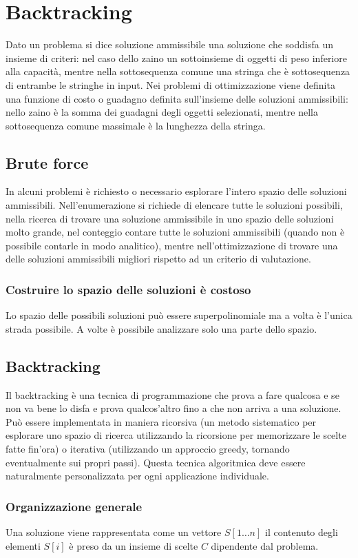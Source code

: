 \chapter{Backtracking}
Dato un problema si dice soluzione ammissibile una soluzione che soddisfa un insieme di criteri: nel caso dello zaino un sottoinsieme di oggetti di peso inferiore alla capacit\`a, mentre
nella sottosequenza comune una stringa che \`e sottosequenza di entrambe le stringhe in input. Nei problemi di ottimizzazione viene definita una funzione di costo o guadagno definita 
sull'insieme delle soluzioni ammissibili: nello zaino \`e la somma dei guadagni degli oggetti selezionati, mentre nella sottosequenza comune massimale \`e la lunghezza della stringa.
\section{Brute force}
In alcuni problemi \`e richiesto o necessario esplorare l'intero spazio delle soluzioni ammissibili. Nell'enumerazione si richiede di elencare tutte le soluzioni possibili, nella ricerca
di trovare una soluzione ammissibile in uno spazio delle soluzioni molto grande, nel conteggio contare tutte le soluzioni ammissibili (quando non \`e possibile contarle in modo 
analitico), mentre nell'ottimizzazione di trovare una delle soluzioni ammissibili migliori rispetto ad un criterio di valutazione. 
\subsection{Costruire lo spazio delle soluzioni \`e costoso}
Lo spazio delle possibili soluzioni pu\`o essere superpolinomiale ma a volta \`e l'unica strada possibile. A volte \`e possibile analizzare solo una parte dello spazio.
\section{Backtracking}
Il backtracking \`e una tecnica di programmazione che prova a fare qualcosa e se non va bene lo disfa e prova qualcos'altro fino a che non arriva a una soluzione. Pu\`o essere 
implementata in maniera ricorsiva (un metodo sistematico per esplorare uno spazio di ricerca utilizzando la ricorsione per memorizzare le scelte fatte fin'ora) o iterativa (utilizzando
un approccio greedy, tornando eventualmente sui propri passi). Questa tecnica algoritmica deve essere naturalmente personalizzata per ogni applicazione individuale.
\subsection{Organizzazione generale}
Una soluzione viene rappresentata come un vettore $S[1\dots n]$ il contenuto degli elementi $S[i]$ \`e preso da un insieme di scelte $C$ dipendente dal problema.
